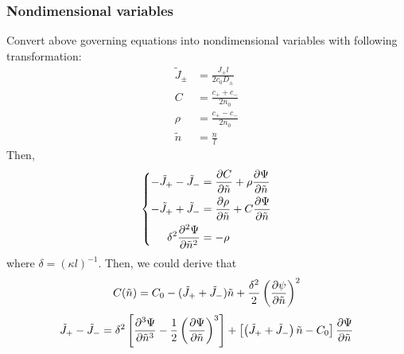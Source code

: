 \documentclass[fontsize=11pt, %
                             paper=a4, %
                             twoside, %
                             captions=tableheading,
                             index=totoc,
                             hyperref]{labbook}
\begin{document}
\begin{addmargin}[4cm]{0cm}
\subsubsection{Nondimensional variables}
Convert above governing equations into nondimensional variables with following transformation:
\begin{equation}
\begin{aligned}
\tilde{J}_\pm&=\frac{J_\pm l}{2 c_0 D_\pm}\\
C&=\frac{c_++c_-}{2n_0}\\
\rho&=\frac{c_+-c_-}{2n_0}\\
\tilde{n}&=\frac{n}{l}
\end{aligned}
\end{equation}
Then,
\begin{equation}
\left\{
\begin{aligned}
-\tilde{J}_+-\tilde{J}_-&=\frac{\partial C}{\partial \tilde{n}}+\rho\frac{\partial \Psi}{\partial \tilde{n}}\\
-\tilde{J}_++\tilde{J}_-&=\frac{\partial \rho}{\partial \tilde{n}}+C\frac{\partial \Psi}{\partial \tilde{n}}\\
\delta^2\frac{\partial^2 \Psi}{\partial \tilde{n}^2}&=-\rho
\end{aligned}
\right.
\end{equation}
where $\delta=(\kappa l)^{-1}$.
Then, we could derive that
\begin{equation}
C(\tilde n)=C_0 - (\tilde J_+ + \tilde J_-)\tilde n +\frac{\delta^2}{2}\left(\frac{\partial \psi}{\partial \tilde n}\right)^2
\end{equation}
\begin{equation}
\tilde J_+ -\tilde J_-=\delta^2\left[\frac{\partial^3\Psi}{\partial \tilde n ^3}-\frac{1}{2}\left(\frac{\partial \Psi}{\partial \tilde n}\right)^3\right]+\left[\left(\tilde J_+ + \tilde J_-\right)\tilde n -C_0\right]\frac{\partial \Psi}{\partial \tilde n}
\end{equation}

\end{addmargin}
\end{document}
